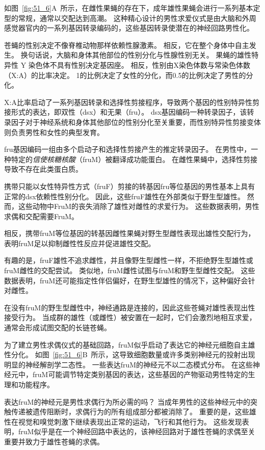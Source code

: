 \begin{proposition}[果蝇交配行为的遗传和神经控制] \label{box:51_1}
	
	\quad \quad 如图~\ref{fig:51_6}A~所示，在雌性果蝇的存在下，成年雄性果蝇会进行一系列基本定型的常规，通常以交配达到高潮。
	这种精心设计的男性求爱仪式是由大脑和外周感觉器官内的一系列基因转录编码的，这些基因转录使潜在的神经回路男性化。
	
	\quad \quad 苍蝇的性别决定不像脊椎动物那样依赖性腺激素。
	相反，它在整个身体中自主发生。
	换句话说，大脑和身体其他部位的性别分化与性腺性别无关。
	果蝇的雄性特异性 Y 染色体不具有性别决定基因座。
	相反，性别由X染色体数与常染色体数（X:A）的比率决定。
	1的比例决定了女性的分化，而0.5的比例决定了男性的分化。
	
	\quad \quad X:A比率启动了一系列基因转录和选择性剪接程序，导致两个基因的性别特异性剪接形式的表达，即双性（dsx）和无果（fru）。
	dsx基因编码一种转录因子，该转录因子对于神经系统和身体其他部位的性别分化至关重要，而性别特异性剪接变体则负责男性和女性的典型发育。
	
	\quad \quad fru基因编码一组由多个启动子和选择性剪接产生的推定转录因子。
	在男性中，一种特定的\textit{信使核糖核酸}（fruM）被翻译成功能蛋白。
	在雌性果蝇中，选择性剪接导致不存在此类蛋白质。
	
	\quad \quad 携带只能以女性特异性方式（fruF）剪接的转基因fru等位基因的男性基本上具有正常的dsx依赖性性别分化。
	因此，这些fruF雄性在外部类似于野生型雄性。
	然而，这些动物中FruM的丧失消除了雄性对雌性的求爱行为。
	这些数据表明，男性求偶和交配需要FruM。
	
	\quad \quad 相反，携带fruM等位基因的转基因雌性果蝇对野生型雌性表现出雄性交配行为，表明fruM足以抑制雌性性反应并促进雄性交配。
	
	\quad \quad 有趣的是，fruF雄性不追求雌性，并且像野生型雌性一样，不拒绝野生型雄性或fruM雌性的交配尝试。
	类似地，fruM雌性试图与fruM和野生型雌性交配。
	这些数据表明，fruM还可能指定性伴侣偏好，在野生型雄性的情况下，这种偏好会针对雌性。
	
	\quad \quad 在没有fruM的野生型雌性中，神经通路是连接的，因此这些苍蝇对雄性表现出性接受行为。
	当成群的雄性（或雌性）被安置在一起时，它们会激烈地相互求爱，通常会形成试图交配的长链苍蝇。
	
	\quad \quad 为了建立男性求偶仪式的基础回路，fruM似乎启动了表达它的神经元细胞自主雄性分化。
	如图~\ref{fig:51_6}B~所示，这导致细胞数量或许多类别神经元的投射出现明显的神经解剖学二态性。
	一些表达fruM的神经元不以二态模式分布。
	在这些神经元中，fruM可能调节特定类别基因的表达，这些基因的产物驱动男性特定的生理和功能程序。
	
	\quad \quad 表达fruM的神经元是男性求偶行为所必需的吗？
	当成年男性的这些神经元中的突触传递被遗传阻断时，求偶行为的所有组成部分都被消除了。
	重要的是，这些雄性在视觉和嗅觉刺激下继续表现出正常的运动，飞行和其他行为。
	这些发现表明，fruM似乎是在一个神经回路中表达的，该神经回路对于雄性苍蝇的求偶至关重要并致力于雄性苍蝇的求偶。
	
\end{proposition}



